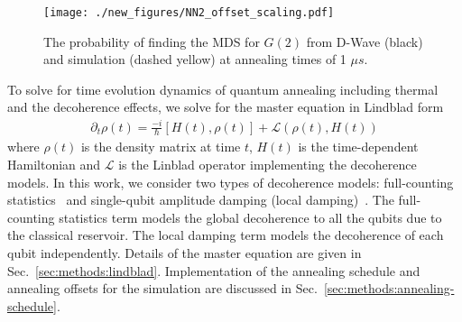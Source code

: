 \documentclass[prd,twocolumn,tightenlines,preprintnumbers,showpacs,superscriptaddress,notitlepage,nofootinbib,eqsecnum,floatfix,longbibliography,aps,10pt]{revtex4-2}
\begin{document}
\begin{figure}[b]
	\centering
	\texttt{[image: ./new\_figures/NN2\_offset\_scaling.pdf]}
	\caption{The probability of finding the MDS for $G(2)$ from D-Wave (black) and simulation (dashed yellow) at annealing times of 1 $\mu s$.}
	\label{fig:dwave1us}
\end{figure}


To solve for time evolution dynamics of quantum annealing including thermal and the decoherence effects, we solve for the master equation in Lindblad form
\begin{align}
 \label{eq:sim:linblad-eq}
 \partial_t \rho (t) =  \frac{-i}{\hbar} [H(t) , \rho(t)] + \mathcal{L}(\rho(t), H(t))
\end{align}
where $\rho (t)$ is the density matrix at time $t$, $H(t)$ is the time-dependent Hamiltonian and $\mathcal{L}$ is the Linblad operator implementing the decoherence models.
In this work, we consider two types of decoherence models: full-counting statistics~\cite{PhysRevE.90.022103,RevModPhys.81.1665} and single-qubit amplitude damping (local damping)~\cite{10.5555/1972505,preskill1998lecture}.
The full-counting statistics term models the global decoherence to all the qubits due to the classical reservoir.
The local damping term models the decoherence of each qubit independently.
Details of the master equation are given in Sec.~\ref{sec:methods:lindblad}.
Implementation of the annealing schedule and annealing offsets for the simulation are discussed in Sec.~\ref{sec:methods:annealing-schedule}.
\end{document}
